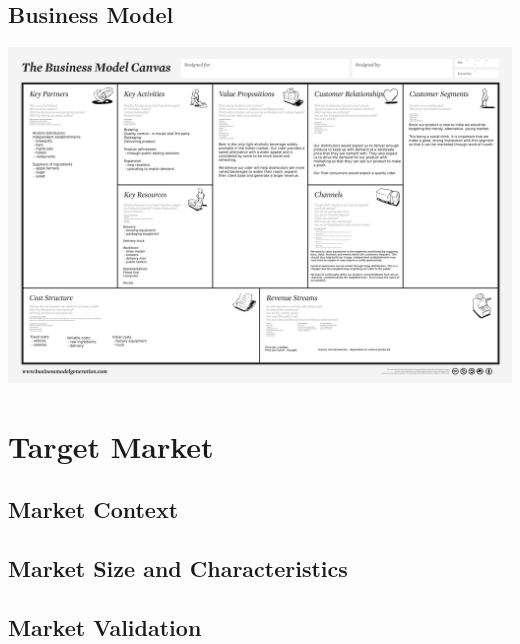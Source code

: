 \documentclass[11pt]{article}
\begin{document}
  \newpage
  \subsection{Business Model}
  \includegraphics[angle=90,width=\textwidth,height=\textheight,keepaspectratio]{./business_model_canvas_poster.png}

\newpage


\section{Target Market}
  \subsection{Market Context}
  \subsection{Market Size and Characteristics}
  \subsection{Market Validation}

\newpage
\end{document}
